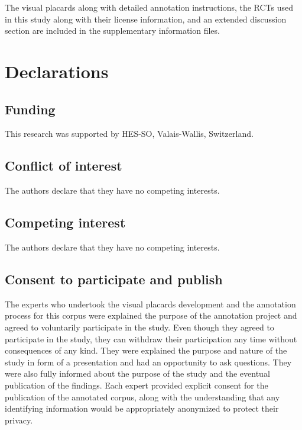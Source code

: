 \documentclass[sn-mathphys,Numbered]{sn-jnl}%
\theoremstyle{thmstyleone}%
\theoremstyle{thmstyletwo}%
\theoremstyle{thmstylethree}%
\begin{document}
%
The visual placards along with detailed annotation instructions, the RCTs used in this study along with their license information, and an extended discussion section are included in the supplementary information files.
%
%
%


%
%
%
\section*{Declarations}
%
\subsection*{Funding}
%
This research was supported by HES-SO, Valais-Wallis, Switzerland. 
%
%
%
\subsection*{Conflict of interest}
%
The authors declare that they have no competing interests.
%
%
%
\subsection*{Competing interest}
%
The authors declare that they have no competing interests.
%
%
%
%
%
%
%
\subsection*{Consent to participate and publish}
%
The experts who undertook the visual placards development and the annotation process for this corpus were explained the purpose of the annotation project and agreed to voluntarily participate in the study.
Even though they agreed to participate in the study, they can withdraw their participation any time without consequences of any kind.
They were explained the purpose and nature of the study in form of a presentation and had an opportunity to ask questions.
They were also fully informed about the purpose of the study and the eventual publication of the findings.
Each expert provided explicit consent for the publication of the annotated corpus, along with the understanding that any identifying information would be appropriately anonymized to protect their privacy. 
%
%
%
\end{document}
